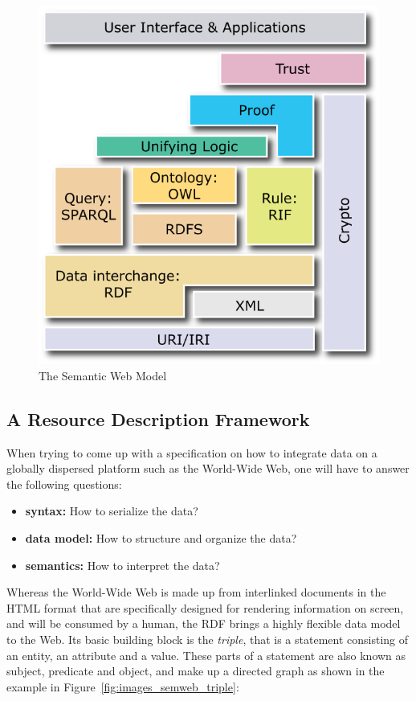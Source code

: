 \begin{figure}[H]
	\centering
		\includegraphics[width=0.8\columnwidth]{images/semantic_web_layers.png}
	\caption[The Semantic Web Model]{The Semantic Web Model \citep{W3C2013}}
\label{fig:images_semweb_model}
\end{figure}


\subsection{A Resource Description Framework}
\label{sec:semantic_rdf}

When trying to come up with a specification on how to integrate data on a globally dispersed platform such as the World-Wide Web, one will have to answer the following questions: \@

\begin{itemize}
	\item \textbf{syntax:} How to serialize the data?
	\item \textbf{data model:} How to structure and organize the data?
	\item \textbf{semantics:} How to interpret the data?
\end{itemize}

Whereas the World-Wide Web is made up from interlinked documents in the \gls{HTML} format that are specifically designed for rendering information on screen, and will be consumed by a human, the \gls{RDF} brings a highly flexible data model to the Web. Its basic building block is the \emph{triple}, that is a statement consisting of an entity, an attribute and a value. These parts of a statement are also known as subject, predicate and object, and make up a directed graph as shown in the example in Figure~\ref{fig:images_semweb_triple}: \@

